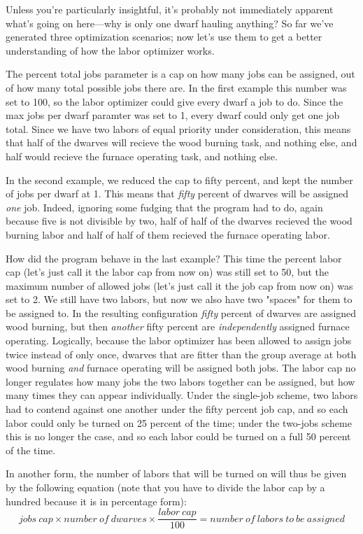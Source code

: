 \documentclass[]{article}
\begin{document}
Unless you're particularly insightful, it's probably not immediately apparent what's going on here---why
is only one dwarf hauling anything? So far we've generated three optimization scenarios; now let's use
them to get a better understanding of how the labor optimizer works.

The percent total jobs parameter is a cap on how many jobs can be assigned, out of how many total
possible jobs there are. In the first example this number was set to 100, so the labor optimizer could
give every dwarf a job to do. Since the max jobs per dwarf paramter was set to 1, every dwarf could only
get one job total. Since we have two labors of equal priority under consideration, this means that half
of the dwarves will recieve the wood burning task, and nothing else, and half would recieve the furnace
operating task, and nothing else.

In the second example, we reduced the cap to fifty percent, and kept the number of jobs per dwarf at 1.
This means that \emph{fifty} percent of dwarves will be assigned \emph{one} job. Indeed, ignoring some
fudging that the program had to do, again because five is not divisible by two, half of half of the
dwarves recieved the wood burning labor and half of half of them recieved the furnace operating labor.

How did the program behave in the last example? This time the percent labor cap (let's just call it the
labor cap from now on) was still set to 50, but the maximum number of allowed jobs (let's just call it
the job cap from now on) was set to 2. We still have two labors, but now we also have two "spaces" for
them to be assigned to. In the resulting configuration \emph{fifty} percent of dwarves are assigned wood
burning, but then \emph{another} fifty percent are \emph{independently} assigned furnace operating.
Logically, because the labor optimizer has been allowed to assign jobs twice instead of only once,
dwarves that are fitter than the group average at both wood burning \emph{and} furnace operating will be
assigned both jobs. The labor cap no longer regulates how many jobs the two labors together can be
assigned, but how many times they can appear individually. Under the single-job scheme, two labors had to
contend against one another under the fifty percent job cap, and so each labor could only be turned on 25
percent of the time; under the two-jobs scheme this is no longer the case, and so each labor could be
turned on a full 50 percent of the time.

In another form, the number of labors that will be turned on will thus be given by the following equation
(note that you have to divide the labor cap by a hundred because it is in percentage form):
\begin{displaymath}
jobs\:cap \times number\:of\:dwarves \times  \frac{labor\:cap}{100} = number\:of\:labors\:to\:be\:assigned
\end{displaymath}
\end{document}
